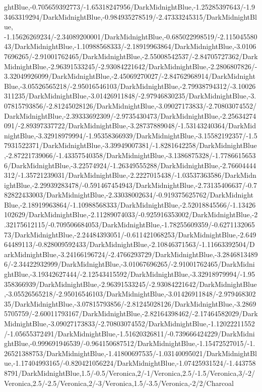 {\begin{tikzternal}
{ghtBlue,-0.705659392773/-1.65318247956/DarkMidnightBlue,-1.25285397643/-1.93463319294/DarkMidnightBlue,-0.984935278519/-2.47333245315/DarkMidnightBlue,
-1.15626269234/-2.34089200001/DarkMidnightBlue,-0.685022998519/-2.11504558043/DarkMidnightBlue,-1.10988568333/-2.18919963864/DarkMidnightBlue,-3.01067696265/-2.91001762465/DarkMidnightBlue,-2.55008542537/-2.84705727362/DarkMidnightBlue,-2.96391533245/-2.93084221642/DarkMidnightBlue,-2.2806807826/-3.32049926099/DarkMidnightBlue,-2.45069270027/-2.84762968914/DarkMidnightBlue,-3.05526565218/-2.95016546103/DarkMidnightBlue,-2.79938794312/-3.10026311235/DarkMidnightBlue,-3.01426911848/-2.97946830235/DarkMidnightBlue,-3.07815793856/-2.81245028126/DarkMidnightBlue,-3.09027173833/-2.70803074552/DarkMidnightBlue,-2.39333692309/-2.9735430473/DarkMidnightBlue,-2.25634274091/-2.89397337722/DarkMidnightBlue,-3.28737889048/-1.53143240364/DarkMidnightBlue,-3.32918979994/-1.95358366939/DarkMidnightBlue,-3.15582192357/-1.57931522371/DarkMidnightBlue,-3.39949007381/-1.8281642258/DarkMidnightBlue,-2.87221739066/-1.43357540358/DarkMidnightBlue,-3.1386875328/-1.77866156536/DarkMidnightBlue,-3.22574924/-1.26349555288/DarkMidnightBlue,-2.76604444312/-1.35721239031/DarkMidnightBlue,-2.2227015438/-1.03537363586/DarkMidnightBlue,-2.29939283478/-0.591467454943/DarkMidnightBlue,-2.73135406637/-0.782822433003/DarkMidnightBlue,-2.33038002634/-0.919375625762/DarkMidnightBlue,-2.18919963864/-1.10988568333/DarkMidnightBlue,-2.52018845566/-1.13426102629/DarkMidnightBlue,-2.11289074033/-0.925916353002/DarkMidnightBlue,-2.32175612115/-0.709506684053/DarkMidnightBlue,-1.78255609359/-0.627113206573/DarkMidnightBlue,-2.24484393051/-0.611421068253/DarkMidnightBlue,-2.64964489113/-0.828009592433/DarkMidnightBlue,-2.10846371563/-1.11663392504/DarkMidnightBlue,-3.24166196724/-2.4766293729/DarkMidnightBlue,-3.28468134896/-2.34422932999/DarkMidnightBlue,-3.01067696265/-2.91001762465/DarkMidnightBlue,-3.19342627444/-2.12543415592/DarkMidnightBlue,-3.32918979994/-1.95358366939/DarkMidnightBlue,-2.96391533245/-2.93084221642/DarkMidnightBlue,-3.05526565218/-2.95016546103/DarkMidnightBlue,-3.01426911848/-2.97946830235/DarkMidnightBlue,-3.07815793856/-2.81245028126/DarkMidnightBlue,-3.28695705759/-2.60011793167/DarkMidnightBlue,-2.82164398462/-2.17464582029/DarkMidnightBlue,-3.09027173833/-2.70803074552/DarkMidnightBlue,-1.12022211552/-1.05655372491/DarkMidnightBlue,-1.51620326811/-0.739666424229/DarkMidnightBlue,-0.999691946539/-0.964150687512/DarkMidnightBlue,-1.15472527015/-1.26521388753/DarkMidnightBlue,-1.41800697535/-1.03140095021/DarkMidnightBlue,-1.17404993165/-0.820421056224/DarkMidnightBlue,-1.07425931524/-1.4437588791/DarkMidnightBlue,1.5/-0.5/Veronica,2/-1/Veronica,2.5/-1.5/Veronica,3/-2/Veronica,2.5/-2.5/Veronica,2/-3/Veronica,1.5/-3.5/Veronica,-2/2/Charcoal} {
 \DATACIRCLE[\c]{(\x,\y)}
}
\end{tikzternal}
}